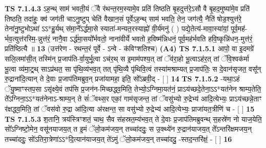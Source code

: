\documentclass[17pt]{extarticle}
\begin{document}
                  \newline
                                \textbf{ TS 7.1.4.3} \newline
                  ऽह॒न्थ् साम॑ भवती॒यं ॅवै र॑थन्त॒रम॒स्यामे॒व प्रति॑ तिष्ठति बृ॒हदुत्त॑रे॒ऽसौ वै बृ॒हद॒मुष्या॑मे॒व प्रति॑ तिष्ठति॒ तदा॑हुः॒ क्व॑ जग॑ती चाऽनु॒ष्टुप् चेति॑ वैखान॒सं पूर्वेऽह॒न्थ् साम॑ भवति॒ तेन॒ जग॑त्यै॒ नैति॑ षोड॒श्युत्त॑रे॒ तेना॑नु॒ष्टुभोऽथा॑ ऽऽ*हु॒र्यथ् स॑मा॒ने᳚ऽर्द्धमा॒से स्याता॑-मन्यत॒रस्याह्नो॑ वी॒र्य॑मनु॑ ( ) पद्ये॒तेत्य॑-मावा॒स्या॑यां॒ पूर्व॒मह॑-र्भव॒त्युत्त॑रस्मि॒-न्नुत्त॑रं॒ नानै॒वा ऽर्द्ध॑मा॒सयो᳚र्भवतो॒ नाना॑वीर्ये भवतो ह॒विष्म॑न्निधनं॒ पूर्व॒मह॑र्भवति हवि॒ष्कृन्नि॑धन॒-मुत्त॑रं॒ प्रति॑ष्ठित्यै ॥ \textbf{  13} \newline
                  \newline
                      (उत्त॑रेण - रथन्त॒रं पूर्वे - ऽन्वे - क॑विꣳशतिश्च)  \textbf{(A4)} \newline \newline
                                        \textbf{ TS 7.1.5.1} \newline
                  आपो॒ वा इ॒दमग्रे॑ सलि॒लमा॑सी॒त् तस्मि॑न् प्र॒जाप॑ति-र्वा॒युर्भू॒त्वा ऽच॑र॒थ् स इ॒माम॑पश्य॒त् तां ॅव॑रा॒हो भू॒त्वाऽह॑र॒त् तां ॅवि॒श्वक॑र्मा भू॒त्वा व्य॑मा॒ट्र्थ् साऽप्र॑थत॒ सा पृ॑थि॒व्य॑भव॒त् तत् पृ॑थि॒व्यै पृ॑थिवि॒त्वं तस्या॑मश्राम्यत् प्र॒जाप॑तिः॒ स दे॒वान॑सृजत॒ वसू᳚न् रु॒द्राना॑दि॒त्यान् ते दे॒वाः प्र॒जाप॑तिमब्रुव॒न् प्रजा॑यामहा॒ इति॒ सो᳚ऽब्रवी॒द् - [  ] \textbf{  14} \newline
                  \newline
                                \textbf{ TS 7.1.5.2} \newline
                  -यथा॒ऽहं ॅयु॒ष्माꣳस्तप॒सा ऽसृ॑क्ष्ये॒वं तप॑सि प्र॒जन॑न-मिच्छद्ध्व॒मिति॒ तेभ्यो॒ऽग्निमा॒यत॑नं॒ प्राऽय॑च्छदे॒तेना॒ऽऽ*यत॑नेन श्राम्य॒तेति॒ ते᳚ऽग्निना॒ऽऽ*यत॑नेनाऽ-श्राम्य॒न् ते सं॑ॅवथ्स॒र एकां॒ गाम॑सृजन्त॒ तां ॅवसु॑भ्यो रु॒द्रेभ्य॑ आदि॒त्येभ्यः॒ प्राऽय॑च्छन्ने॒ताꣳ र॑क्षद्ध्व॒मिति॒ तां ॅवस॑वो रु॒द्रा आ॑दि॒त्या अ॑रक्षन्त॒ सा वसु॑भ्यो रु॒द्रेभ्य॑ आदि॒त्येभ्यः॒ प्राजा॑यत॒त्रीणि॑ च - [  ] \textbf{  15} \newline
                  \newline
                                \textbf{ TS 7.1.5.3} \newline
                  श॒तानि॒ त्रय॑स्त्रिꣳशतं॒ चाथ॒ सैव स॑हस्रत॒म्य॑भव॒त् ते दे॒वाः प्र॒जाप॑तिमब्रुवन्थ् स॒हस्रे॑ण नो याज॒येति॒ सो᳚ऽग्निष्टो॒मेन॒ वसू॑नयाजय॒त् त इ॒मं ॅलो॒कम॑जय॒न् तच्चा॑ददुः॒ स उ॒क्थ्ये॑न रु॒द्रान॑याजय॒त् ते᳚ऽन्तरि॑क्षमजय॒न् तच्चा॑ददुः॒ सो॑ऽतिरा॒त्रेणा॑ऽऽ*दि॒त्यान॑याजय॒त् ते॑ऽमुं ॅलो॒कम॑जय॒न् तच्चा॑ददु॒ -स्तद॒न्तरि॑क्षं॒ - [  ] \textbf{  16} \newline
\end{document}
